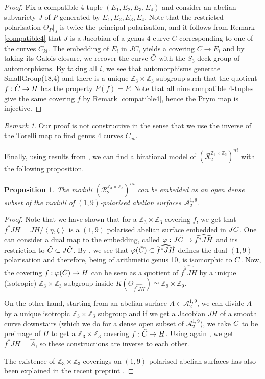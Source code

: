 \documentclass{amsart}
\newtheorem{prop}[thm]{Proposition}
\theoremstyle{remark}
\newtheorem{rem}[thm]{Remark}
\numberwithin{equation}{section}
\newcommand{\ZZ}{\mathbb Z}
\newcommand{\cA}{\mathcal{A}}
\newcommand{\tC}{\Tilde{C}}
\newcommand{\cR}{\mathcal{R}}
\begin{document}
\begin{proof}
Fix a compatible 4-tuple $(E_1, E_2, E_3, E_4)$ and consider an abelian subvariety $J$ of $P$ generated by $E_1, E_2, E_3, E_4$. Note that the restricted polarisation $\Theta_P|_J$ is twice the principal polarisation, and it follows from Remark \ref{compatible4} that $J$ is a Jacobian of a genus 4 curve $C$ corresponding to one of the curves $C_{kl}$. The embedding of $E_i$ in $JC$, yields a covering $C\to E_i$ and by taking its Galois closure, we recover the curve $\tC$ with the $S_3$ deck group of automorphisms. By taking all $i$, we see that automorphisms generate SmallGroup(18,4) and there is a unique $\mathbb{Z}_3 \times \mathbb{Z}_3$ subgroup such that the quotient $f:\tC \to H$ has the property $P(f) = P$. Note that all nine compatible 4-tuples give the same covering $f$ by Remark \ref{compatible4}, hence the Prym map is injective.
\end{proof}
\begin{rem}
    Our proof is not constructive in the sense that we use the inverse of the Torelli map to find genus $4$ curves $C_{ab}$.
\end{rem}

Finally, using results from \cite{BLiso}, we can find a birational model of $(\cR_2^{\ZZ_3\times\ZZ_3})^{ni}$ with the following proposition.
\begin{prop}
    The moduli $(\cR_2^{\ZZ_3\times\ZZ_3})^{ni}$ can be embedded as an open dense subset of the moduli of $(1,9)$-polarised abelian surfaces $\cA_2^{{1,9}}$.
\end{prop}
\begin{proof}
Note that we have shown that for a $\ZZ_3\times\ZZ_3$ covering $f$, we get that $f^*JH=JH/\left<\eta,\zeta\right>$ is a $(1,9)$ polarised abelian surface embedded in $J\tC$. One can consider a dual map to the embedding, called $\varphi:J\tC\to\widehat{f^*JH}$ and its restriction to $\tC\subset J\tC$. By \cite[Prop 4.3]{BLiso}, we see that $\varphi(\tC)\subset \widehat{f^*JH}$ defines the dual $(1,9)$ polarisation and therefore, being of arithmetic genus 10, is isomorphic to $\tC$. Now, the covering $f:\varphi(\tC)\to H$ can be seen as a quotient of $\widehat{f^*JH}$ by a unique (isotropic) $\ZZ_3\times \ZZ_3$ subgroup inside $K(\Theta_{\widehat{f^*JH}})\simeq\ZZ_9\times\ZZ_9$. 

On the other hand, starting from an abelian surface $A\in\cA_2^{{1,9}}$, we can divide $A$ by a unique isotropic $\ZZ_3\times\ZZ_3$ subgroup and if we get a Jacobian $JH$ of a smooth curve downstairs (which we do for a dense open subset of $\cA_2^{{1,9}}$), we take $\tC$ to be preimage of $H$ to get a $\ZZ_3\times\ZZ_3$ covering $f:\tC\to H$. Using again \cite[Prop 4.3]{BLiso}, we get $f^*JH=\widehat{A}$, so these constructions are inverse to each other.

The existence of $\ZZ_3\times\ZZ_3$ coverings on $(1,9)$-polarised abelian surfaces has also been explained in the recent preprint \cite[Thm 4.3]{HS}.
\end{proof}
\end{document}
